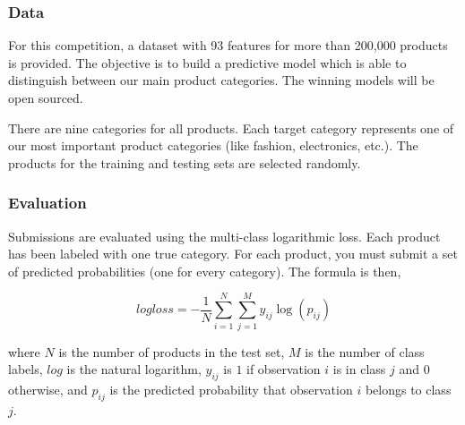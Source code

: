 \subsubsection{Data}
For this competition, a dataset with 93 features for more than 200,000 products is provided. The objective is to build a predictive model which is able to distinguish between our main product categories. The winning models will be open sourced.

There are nine categories for all products. Each target category represents one of our most important product categories (like fashion, electronics, etc.). The products for the training and testing sets are selected randomly.
\subsubsection{Evaluation}
Submissions are evaluated using the multi-class logarithmic loss. Each product has been labeled with one true category. For each product, you must submit a set of predicted probabilities (one for every category). The formula is then,

$$ logloss=-\frac{1}{N}\sum_{i=1}^{N} \sum_{j=1}^{M}y_{ij}\log(p_{ij}) $$

where $N$ is the number of products in the test set, $M$ is the number of class labels, $log$ is the natural logarithm, $y_{ij}$ is $1$ if observation $i$ is in class $j$ and $0$ otherwise, and $p_{ij}$ is the predicted probability that observation $i$ belongs to class $j$.
